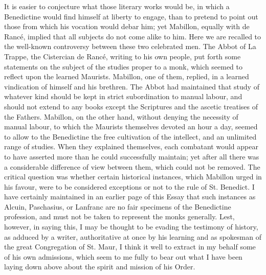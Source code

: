 It is easier to conjecture what those literary works would be, in
which a Benedictine would find himself at liberty to engage, than to
pretend to point out those from which his vocation would debar him;
yet Mabillon, equally with de Rancé, implied that all subjects do not
come alike to him. Here we are recalled to the well-known controversy
between these two celebrated men. The Abbot of La Trappe, the
Cistercian de Rancé, writing to his own people, put forth some
statements on the subject of the studies proper to a monk, which seemed to reflect upon the learned Maurists. Mabillon, one of them,
replied, in a learned vindication of himself and his brethren. The
Abbot had maintained that study of whatever kind should be kept in
strict subordination to manual labour, and should not extend to any
books except the Scriptures and the ascetic treatises of the Fathers.
Mabillon, on the other hand, without denying the necessity of manual
labour, to which the Maurists themselves devoted an hour a day, seemed
to allow to the Benedictine the free cultivation of the intellect, and
an unlimited range of studies. When they explained themselves, each
combatant would appear to have asserted more than he could
successfully maintain; yet after all there was a considerable
difference of view between them, which could not be removed. The
critical question was whether certain historical instances, which
Mabillon urged in his favour, were to be considered exceptions or not
to the rule of St. Benedict. I have certainly maintained in an earlier
page of this Essay that such instances as Alcuin, Paschasius, or
Lanfranc are no fair specimens of the Benedictine profession, and must
not be taken to represent the monks generally. Lest, however, in
saying this, I may be thought to be evading the testimony of history,
as adduced by a writer, authoritative at once by his learning and as
spokesman of the great Congregation of St. Maur, I think it well to
extract in my behalf some of his own admissions, which seem to me
fully to bear out what I have been laying down above about the spirit
and mission of his Order.

